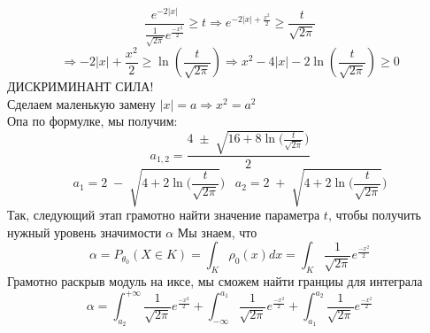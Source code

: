 \documentclass[a4paper, 12pt]{article} %
\begin{document}
\[
    \frac{e^{-2|x|}}{\frac{1}{\sqrt{2\pi}}e^{\frac{-x^2}{2}}} \geq t 
    \Rightarrow e^{-2|x| + \frac{x^2}{2}} \geq \frac{t}{\sqrt{2\pi}}
    \] 
\[ 
    \Rightarrow -2|x| + \frac{x^2}{2} \geq \ln(\frac{t}{\sqrt{2\pi}})
    \Rightarrow x^2 - 4|x| - 2\ln(\frac{t}{\sqrt{2\pi}}) \geq 0
\]
ДИСКРИМИНАНТ СИЛА! \\
Сделаем маленькую замену $|x| = a \Rightarrow x^2 = a^2 $
\\ Опа по формулке, мы получим:
\[
    a_{1,2}  = \frac{4 \; \pm \; \sqrt{16 + 8\ln(\frac{t}{\sqrt{2\pi}}})}{2}     
\]
\[
    a_1 =  2 \; - \; \sqrt{4 + 2\ln(\frac{t}{\sqrt{2\pi}}}) \; \; \;
    a_2 =  2 \; + \; \sqrt{4 + 2\ln(\frac{t}{\sqrt{2\pi}}})
    \]
Так, следующий этап грамотно найти значение параметра $t$, 
чтобы получить нужный уровень значимости $\alpha$
Мы знаем, что 
\[
\alpha = P_{\theta_0}(X \in K) = \int_{K}\rho_0(x)dx =  \int_{K} \frac{1}{\sqrt{2\pi}}e^{\frac{-x^2}{2}} 
\]
Грамотно раскрыв модуль на иксе, мы сможем найти гранциы для интеграла
\[
    \alpha =  \int_{a_2}^{+\infty}\frac{1}{\sqrt{2\pi}}e^{\frac{-x^2}{2}} 
    + \int_{-\infty}^{a_1}\frac{1}{\sqrt{2\pi}}e^{\frac{-x^2}{2}} + \int_{a_1}^{a_2}\frac{1}{\sqrt{2\pi}}e^{\frac{-x^2}{2}}
    \]
\end{document}
